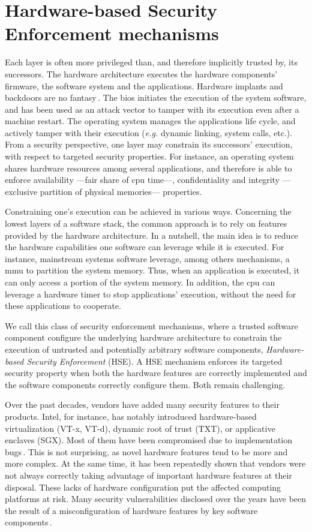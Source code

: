 \section{Hardware-based Security Enforcement mechanisms}

Each layer is often more privileged than, and therefore implicitly trusted by,
its successors.
%
The hardware architecture executes the hardware components' firmware, the
software system and the applications.
%
Hardware implants and backdoors are no fantasy\,\cite{yang2016a2}.
%
The \ac{bios} initiates the execution of the system software, and has been used
as an attack vector to tamper with its execution even after a machine restart.
%
The operating system manages the applications life cycle, and actively tamper
with their execution (\emph{e.g.} dynamic linking, system calls, etc.).
%
From a security perspective, one layer may constrain its successors' execution,
with respect to targeted security properties.
%
For instance, an operating system shares hardware resources among several
applications, and therefore is able to enforce availability ---fair share of
\ac{cpu} time---, confidentiality and integrity ---exclusive partition of
physical memories--- properties.

Constraining one's execution can be achieved in various ways.
%
Concerning the lowest layers of a software stack, the common approach is to rely
on features provided by the hardware architecture.
%
In a nutshell, the main idea is to reduce the hardware capabilities one software
can leverage while it is executed.
%
For instance, mainstream systems software leverage, among others mechanisms, a
\ac{mmu} to partition the system memory.
%
Thus, when an application is executed, it can only access a portion of the
system memory.
%
In addition, the \ac{cpu} can leverage a hardware timer to stop applications'
execution, without the need for these applications to cooperate.

We call this class of security enforcement mechanisms, where a trusted software
component configure the underlying hardware architecture to constrain the
execution of untrusted and potentially arbitrary software components,
\emph{Hardware-based Security Enforcement} (HSE).
%
A HSE mechanism enforces its targeted security property when both the hardware
features are correctly implemented and the software components correctly
configure them.
%
Both remain challenging.

Over the past decades, vendors have added many security features to their
products.
%
Intel, for instance, has notably introduced hardware-based virtualization (VT-x,
VT-d), dynamic root of trust (TXT), or applicative enclaves (SGX).
%
Most of them have been compromised due to implementation
bugs\,\cite{wojtczuk2011txtbug,sang2010iommu}.
%
This is not surprising, as novel hardware features tend to be more and more
complex.
%
At the same time, it has been repeatedly shown that vendors were not always
correctly taking advantage of important hardware features at their disposal.
%
These lacks of hardware configuration put the affected computing platforms at
risk.
%
Many security vulnerabilities disclosed over the years have been the result of a
misconfiguration of hardware features by key software
components\,\cite{bulygin2014bios}.

